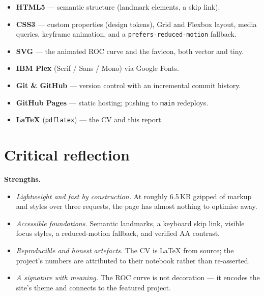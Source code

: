 \documentclass[11pt,a4paper]{article}
\begin{document}
\begin{itemize}
  \item \textbf{HTML5} --- semantic structure (landmark elements, a skip link).
  \item \textbf{CSS3} --- custom properties (design tokens), Grid and Flexbox
        layout, media queries, keyframe animation, and a
        \texttt{prefers-reduced-motion} fallback.
  \item \textbf{SVG} --- the animated ROC curve and the favicon, both vector and
        tiny.
  \item \textbf{IBM Plex} (Serif / Sans / Mono) via Google Fonts.
  \item \textbf{Git \& GitHub} --- version control with an incremental commit
        history.
  \item \textbf{GitHub Pages} --- static hosting; pushing to \texttt{main}
        redeploys.
  \item \textbf{LaTeX} (\texttt{pdflatex}) --- the CV and this report.
\end{itemize}

\section{Critical reflection}

\textbf{Strengths.}
\begin{itemize}
  \item \emph{Lightweight and fast by construction.} At roughly 6.5\,KB gzipped of
        markup and styles over three requests, the page has almost nothing to
        optimise away.
  \item \emph{Accessible foundations.} Semantic landmarks, a keyboard skip link,
        visible focus styles, a reduced-motion fallback, and verified AA contrast.
  \item \emph{Reproducible and honest artefacts.} The CV is LaTeX from source;
        the project's numbers are attributed to their notebook rather than
        re-asserted.
  \item \emph{A signature with meaning.} The ROC curve is not decoration --- it
        encodes the site's theme and connects to the featured project.
\end{itemize}
\end{document}
